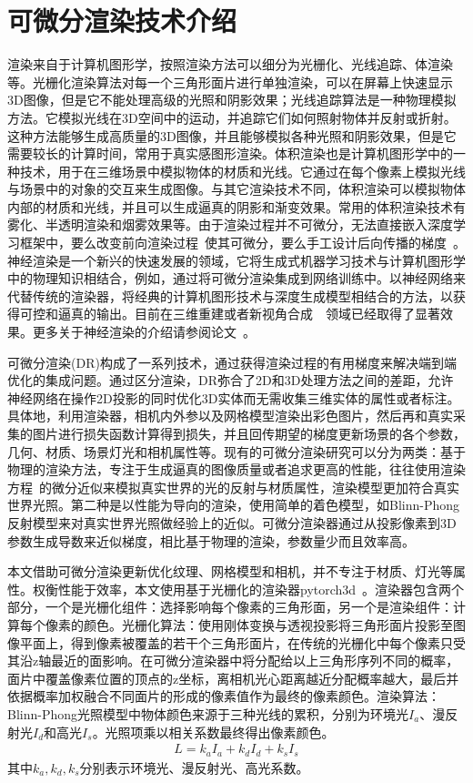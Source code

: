 \section{可微分渲染技术介绍}
渲染来自于计算机图形学，按照渲染方法可以细分为光栅化、光线追踪、体渲染等。光栅化渲染算法对每一个三角形面片进行单独渲染，可以在屏幕上快速显示3D图像，但是它不能处理高级的光照和阴影效果；光线追踪算法是一种物理模拟方法。它模拟光线在3D空间中的运动，并追踪它们如何照射物体并反射或折射。这种方法能够生成高质量的3D图像，并且能够模拟各种光照和阴影效果，但是它需要较长的计算时间，常用于真实感图形渲染。体积渲染也是计算机图形学中的一种技术，用于在三维场景中模拟物体的材质和光线。它通过在每个像素上模拟光线与场景中的对象的交互来生成图像。与其它渲染技术不同，体积渲染可以模拟物体内部的材质和光线，并且可以生成逼真的阴影和渐变效果。常用的体积渲染技术有雾化、半透明渲染和烟雾效果等。由于渲染过程并不可微分，无法直接嵌入深度学习框架中，要么改变前向渲染过程~\cite{ShichenLiu2019SoftRA}使其可微分，要么手工设计后向传播的梯度~\cite{HiroharuKato2017Neural3M}。神经渲染是一个新兴的快速发展的领域，它将生成式机器学习技术与计算机图形学中的物理知识相结合，例如，通过将可微分渲染集成到网络训练中。以神经网络来代替传统的渲染器，将经典的计算机图形技术与深度生成模型相结合的方法，以获得可控和逼真的输出。目前在三维重建\cite{yariv2020multiview}或者新视角合成~\cite{mildenhall2021nerf}~\cite{zhang2020nerf++}领域已经取得了显著效果。更多关于神经渲染的介绍请参阅论文~\cite{tewari2020state}。\par
可微分渲染(DR)构成了一系列技术，通过获得渲染过程的有用梯度来解决端到端优化的集成问题。通过区分渲染，DR弥合了2D和3D处理方法之间的差距，允许神经网络在操作2D投影的同时优化3D实体而无需收集三维实体的属性或者标注。具体地，利用渲染器，相机内外参以及网格模型渲染出彩色图片，然后再和真实采集的图片进行损失函数计算得到损失，并且回传期望的梯度更新场景的各个参数，几何、材质、场景灯光和相机属性等。现有的可微分渲染研究可以分为两类：基于物理的渲染方法，专注于生成逼真的图像质量或者追求更高的性能，往往使用渲染方程~\cite{kajiya1986rendering}的微分近似来模拟真实世界的光的反射与材质属性，渲染模型更加符合真实世界光照。第二种是以性能为导向的渲染，使用简单的着色模型，如Blinn-Phong反射模型来对真实世界光照做经验上的近似。可微分渲染器通过从投影像素到3D参数生成导数来近似梯度，相比基于物理的渲染，参数量少而且效率高。\par
本文借助可微分渲染更新优化纹理、网格模型和相机，并不专注于材质、灯光等属性。权衡性能于效率，本文使用基于光栅化的渲染器pytorch3d~\cite{ravi2020pytorch3d}。渲染器包含两个部分，一个是光栅化组件：选择影响每个像素的三角形面，另一个是渲染组件：计算每个像素的颜色。光栅化算法：使用刚体变换与透视投影将三角形面片投影至图像平面上，得到像素被覆盖的若干个三角形面片，在传统的光栅化中每个像素只受其沿z轴最近的面影响。在可微分渲染器中将分配给以上三角形序列不同的概率，面片中覆盖像素位置的顶点的z坐标，离相机光心距离越近分配概率越大，最后并依据概率加权融合不同面片的形成的像素值作为最终的像素颜色。渲染算法：Blinn-Phong光照模型中物体颜色来源于三种光线的累积，分别为环境光$I_a$、漫反射光$I_d$和高光$I_s$。光照项乘以相关系数最终得出像素颜色。
\begin{align}
    L = k_aI_a + k_dI_d+k_sI_s
\end{align}
其中$k_a,k_d,k_s$分别表示环境光、漫反射光、高光系数。

